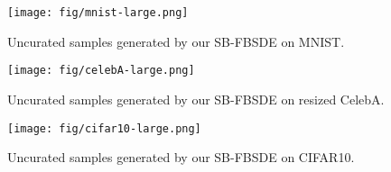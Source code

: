 \documentclass{article}
\begin{document}
\begin{figure}[h]
\begin{center}
\texttt{[image: fig/mnist-large.png]}
\vskip -0.05in
\caption{
    Uncurated samples generated by our SB-FBSDE on MNIST.
}
\end{center}
\end{figure}

\newpage

\begin{figure}[h]
\begin{center}
\texttt{[image: fig/celebA-large.png]}
\vskip -0.05in
\caption{
    Uncurated samples generated by our SB-FBSDE on resized CelebA.
}
\end{center}
\end{figure}

\newpage

\begin{figure}[h]
\begin{center}
\texttt{[image: fig/cifar10-large.png]}
\vskip -0.05in
\caption{
    Uncurated samples generated by our SB-FBSDE on CIFAR10.
}
\end{center}
\end{figure}
 
\end{document}
